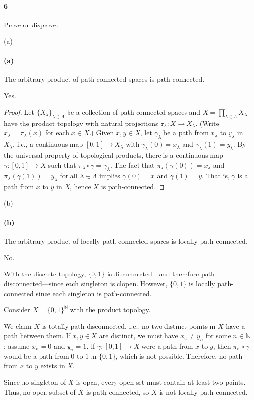 \documentclass[12pt]{article}
\newlength{\myparskip}
\newenvironment{fullbox}{\begin{lrbox}{\savefullbox}\begin{minipage}{\dimexpr\textwidth-2\fboxsep\relax}\setlength{\parskip}{\myparskip}}{\end{minipage}\end{lrbox}\framebox[\textwidth]{\usebox{\savefullbox}}}
\newenvironment{pbox}[1][]{\begin{fullbox}\ifx#1\empty\else\paragraph{#1}\phantom{}\fi}{\end{fullbox}}
\theoremstyle{definition}
\newcommand{\N}{\mathbb{N}}
\newcommand{\<}{\langle}
\renewcommand{\>}{\rangle}
\begin{document}
\newpage
\begin{pbox}[6]
    Prove or disprove:
\end{pbox}

\begin{pbox}[(a)]
    The arbitrary product of path-connected spaces is path-connected.
\end{pbox}

Yes.

\begin{proof}
    Let $\{X_\lambda\}_{\lambda \in \Lambda}$ be a collection of path-connected spaces and $X = \prod_{\lambda \in \Lambda} X_\lambda$ have the product topology with natural projections $\pi_\lambda : X \to X_\lambda$.
    (Write $x_\lambda = \pi_\lambda(x)$ for each $x \in X$.)
    Given $x, y \in X$, let $\gamma_\lambda$ be a path from $x_\lambda$ to $y_\lambda$ in $X_\lambda$, i.e., a continuous map $[0, 1] \to X_\lambda$ with $\gamma_\lambda(0) = x_\lambda$ and $\gamma_\lambda(1) = y_\lambda$.
    By the universal property of topological products, there is a continuous map $\gamma : [0, 1] \to X$ such that $\pi_\lambda \circ \gamma = \gamma_\lambda$.
    The fact that $\pi_\lambda(\gamma(0)) = x_\lambda$ and $\pi_\lambda(\gamma(1)) = y_\lambda$ for all $\lambda \in \Lambda$ implies $\gamma(0) = x$ and $\gamma(1) = y$.
    That is, $\gamma$ is a path from $x$ to $y$ in $X$, hence $X$ is path-connected.
\end{proof}

\begin{pbox}[(b)]
    The arbitrary product of locally path-connected spaces is locally path-connected.
\end{pbox}

No.

With the discrete topology, $\{0, 1\}$ is disconnected---and therefore path-disconnected---since each singleton is clopen.
However, $\{0, 1\}$ is locally path-connected since each singleton is path-connected.

Consider $X = \{0, 1\}^\N$ with the product topology.

We claim $X$ is totally path-disconnected, i.e., no two distinct points in $X$ have a path between them.
If $x, y \in X$ are distinct, we must have $x_n \ne y_n$ for some $n \in \N$; assume $x_n = 0$ and $y_n = 1$.
If $\gamma : [0, 1] \to X$ were a path from $x$ to $y$, then $\pi_n \circ \gamma$ would be a path from $0$ to $1$ in $\{0, 1\}$, which is not possible.
Therefore, no path from $x$ to $y$ exists in $X$.

Since no singleton of $X$ is open, every open set must contain at least two points.
Thus, no open subset of $X$ is path-connected, so $X$ is not locally path-connected.
\end{document}
